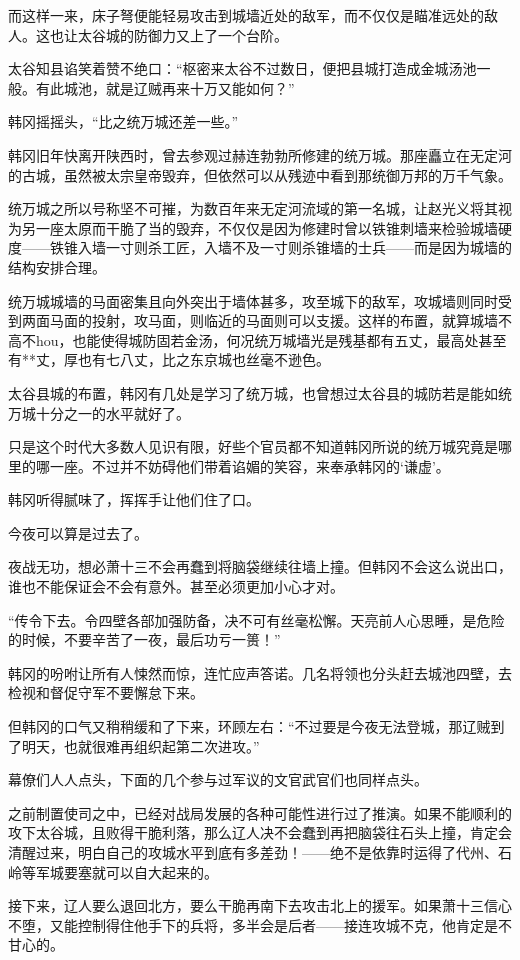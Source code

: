 而这样一来，床子弩便能轻易攻击到城墙近处的敌军，而不仅仅是瞄准远处的敌人。这也让太谷城的防御力又上了一个台阶。

太谷知县谄笑着赞不绝口：“枢密来太谷不过数日，便把县城打造成金城汤池一般。有此城池，就是辽贼再来十万又能如何？”

韩冈摇摇头，“比之统万城还差一些。”

韩冈旧年快离开陕西时，曾去参观过赫连勃勃所修建的统万城。那座矗立在无定河的古城，虽然被太宗皇帝毁弃，但依然可以从残迹中看到那统御万邦的万千气象。

统万城之所以号称坚不可摧，为数百年来无定河流域的第一名城，让赵光义将其视为另一座太原而干脆了当的毁弃，不仅仅是因为修建时曾以铁锥刺墙来检验城墙硬度——铁锥入墙一寸则杀工匠，入墙不及一寸则杀锥墙的士兵——而是因为城墙的结构安排合理。

统万城城墙的马面密集且向外突出于墙体甚多，攻至城下的敌军，攻城墙则同时受到两面马面的投射，攻马面，则临近的马面则可以支援。这样的布置，就算城墙不高不hou，也能使得城防固若金汤，何况统万城墙光是残基都有五丈，最高处甚至有**丈，厚也有七八丈，比之东京城也丝毫不逊色。

太谷县城的布置，韩冈有几处是学习了统万城，也曾想过太谷县的城防若是能如统万城十分之一的水平就好了。

只是这个时代大多数人见识有限，好些个官员都不知道韩冈所说的统万城究竟是哪里的哪一座。不过并不妨碍他们带着谄媚的笑容，来奉承韩冈的‘谦虚’。

韩冈听得腻味了，挥挥手让他们住了口。

今夜可以算是过去了。

夜战无功，想必萧十三不会再蠢到将脑袋继续往墙上撞。但韩冈不会这么说出口，谁也不能保证会不会有意外。甚至必须更加小心才对。

“传令下去。令四壁各部加强防备，决不可有丝毫松懈。天亮前人心思睡，是危险的时候，不要辛苦了一夜，最后功亏一篑！”

韩冈的吩咐让所有人悚然而惊，连忙应声答诺。几名将领也分头赶去城池四壁，去检视和督促守军不要懈怠下来。

但韩冈的口气又稍稍缓和了下来，环顾左右：“不过要是今夜无法登城，那辽贼到了明天，也就很难再组织起第二次进攻。”

幕僚们人人点头，下面的几个参与过军议的文官武官们也同样点头。

之前制置使司之中，已经对战局发展的各种可能性进行过了推演。如果不能顺利的攻下太谷城，且败得干脆利落，那么辽人决不会蠢到再把脑袋往石头上撞，肯定会清醒过来，明白自己的攻城水平到底有多差劲！——绝不是依靠时运得了代州、石岭等军城要塞就可以自大起来的。

接下来，辽人要么退回北方，要么干脆再南下去攻击北上的援军。如果萧十三信心不堕，又能控制得住他手下的兵将，多半会是后者——接连攻城不克，他肯定是不甘心的。

